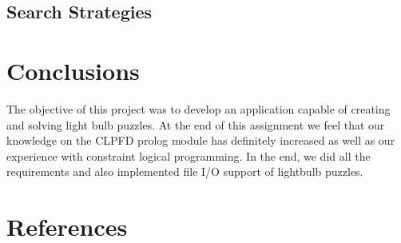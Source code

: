 \documentclass[runningheads]{llncs}
\begin{document}
\subsection{Search Strategies}

\section{Conclusions}
The objective of this project was to develop an application capable of creating and solving light bulb puzzles. At the end of this assignment we feel that our knowledge on the CLPFD prolog module has definitely increased as well as our experience with constraint logical programming.\hfill \break
In the end, we did all the requirements and also implemented file I/O support of lightbulb puzzles.

\section{References}

%
%
% 
% 
%
\begin{thebibliography}{8}
	

\end{thebibliography}
\end{document}

